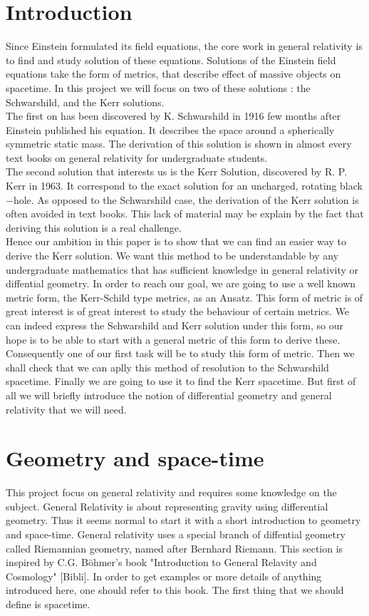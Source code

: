 \documentclass[a4paper,12pt]{article}
\theoremstyle{definition}
\begin{document}
\section{Introduction}
Since Einstein formulated its field equations, the core work in general relativity is to find and study solution of these equations.
Solutions of the Einstein field equations take the form of metrics, that describe effect of massive objects on spacetime.
In this project we will focus on two of these solutions : the Schwarshild, and the Kerr solutions.
\\The first on has been discovered by K. Schwarshild in 1916 few months after Einstein published his equation.
It describes the space around a spherically symmetric static mass.
The derivation of this solution is shown in almost every text books on general relativity for undergraduate students.
\\The second solution that interests us is the Kerr Solution, discovered by R. P. Kerr in 1963.
It correspond to the exact solution for an uncharged, rotating black$-$hole.
As opposed to the Schwarshild case, the derivation of the Kerr solution is often avoided in text books.
This lack of material may be explain by the fact that deriving this solution is a real challenge.
\\Hence our ambition in this paper is to show that we can find an easier way to derive the Kerr solution.
We want this method to be understandable by any undergraduate mathematics that has sufficient knowledge in general relativity or diffential geometry.
In order to reach our goal, we are going to use a well known metric form, the Kerr-Schild type metrics, as an Ansatz.
This form of metric is of great interest is of great interest to study the behaviour of certain metrics.
We can indeed express the Schwarshild and Kerr solution under this form, so our hope is to be able to start with a general metric of this form to derive these.
\\Consequently one of our first task will be to study this form of metric.
Then we shall check that we can aplly this method of resolution to the Schwarshild spacetime.
Finally we are going to use it to find the Kerr spacetime. But first of all we will briefly introduce the notion of differential geometry and general relativity that we will need.



\section{Geometry and space-time}
This project focus on general relativity and requires some knowledge on the subject.
General Relativity is about representing gravity using differential geometry.
Thus it seems normal to start it with a short introduction to geometry and space-time.
General relativity uses a special branch of diffential geometry called Riemannian geometry, named after Bernhard Riemann.
This section is inspired by C.G. B\"ohmer's book "Introduction to General Relavity and Cosmology" [Bibli].
In order to get examples or more details of anything introduced here, one should refer to this book.
The first thing that we should define is spacetime.
\end{document}
